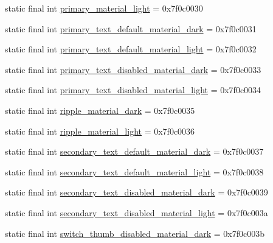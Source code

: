 \begin{CompactItemize}
\item 
static final int \hyperlink{classandroid_1_1support_1_1v7_1_1palette_1_1_r_1_1color_4433a45b672f688a92ceec13173045cc}{primary\_\-material\_\-light} = 0x7f0c0030
\item 
static final int \hyperlink{classandroid_1_1support_1_1v7_1_1palette_1_1_r_1_1color_9f453a0ac7610c5cae12fbdb9752bbf7}{primary\_\-text\_\-default\_\-material\_\-dark} = 0x7f0c0031
\item 
static final int \hyperlink{classandroid_1_1support_1_1v7_1_1palette_1_1_r_1_1color_f86260fbb3a77f19a7374293c0ec7596}{primary\_\-text\_\-default\_\-material\_\-light} = 0x7f0c0032
\item 
static final int \hyperlink{classandroid_1_1support_1_1v7_1_1palette_1_1_r_1_1color_c10a0752929e7f5d82e8fa13ec1fcf94}{primary\_\-text\_\-disabled\_\-material\_\-dark} = 0x7f0c0033
\item 
static final int \hyperlink{classandroid_1_1support_1_1v7_1_1palette_1_1_r_1_1color_1996755557115e2e354a2963831450a0}{primary\_\-text\_\-disabled\_\-material\_\-light} = 0x7f0c0034
\item 
static final int \hyperlink{classandroid_1_1support_1_1v7_1_1palette_1_1_r_1_1color_fb591f65fd39bb2b40e44abfd4f8fadc}{ripple\_\-material\_\-dark} = 0x7f0c0035
\item 
static final int \hyperlink{classandroid_1_1support_1_1v7_1_1palette_1_1_r_1_1color_7fb1fdeaff7bcfa68b5400823c649993}{ripple\_\-material\_\-light} = 0x7f0c0036
\item 
static final int \hyperlink{classandroid_1_1support_1_1v7_1_1palette_1_1_r_1_1color_deb6dc6b0b9906899c1be0982c1d9f64}{secondary\_\-text\_\-default\_\-material\_\-dark} = 0x7f0c0037
\item 
static final int \hyperlink{classandroid_1_1support_1_1v7_1_1palette_1_1_r_1_1color_ad46600d47f3e062419e59349ca406cf}{secondary\_\-text\_\-default\_\-material\_\-light} = 0x7f0c0038
\item 
static final int \hyperlink{classandroid_1_1support_1_1v7_1_1palette_1_1_r_1_1color_df7218fcc514160310a6b961eba8091f}{secondary\_\-text\_\-disabled\_\-material\_\-dark} = 0x7f0c0039
\item 
static final int \hyperlink{classandroid_1_1support_1_1v7_1_1palette_1_1_r_1_1color_6f380a21bb88a3fc5aaa9694e06bcb13}{secondary\_\-text\_\-disabled\_\-material\_\-light} = 0x7f0c003a
\item 
static final int \hyperlink{classandroid_1_1support_1_1v7_1_1palette_1_1_r_1_1color_23ea426e99fbbad4dd0c70004cff5647}{switch\_\-thumb\_\-disabled\_\-material\_\-dark} = 0x7f0c003b

\end{CompactItemize}
